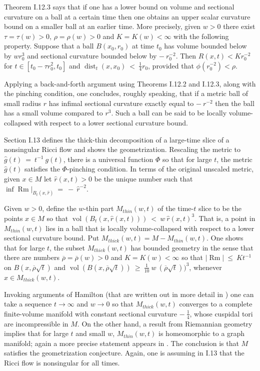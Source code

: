 \documentclass[12pt]{amsart}
\newcommand{\dist}{\operatorname{dist}}
\newcommand{\Rm}{\operatorname{Rm}}
\newcommand{\vol}{\operatorname{vol}}
\numberwithin{equation}{section}
\theoremstyle{plain}
\theoremstyle{definition}
\theoremstyle{remark}
\begin{document}
Theorem I.12.3 says that if one has a lower bound on volume and sectional
curvature on a ball at a certain time then one obtains an upper scalar
curvature bound on a smaller ball at an earlier time.  More precisely,
given $w > 0$ there exist $\tau = \tau(w) > 0$, $\rho = \rho(w) > 0$ and
$K = K(w) < \infty$ with the following property.  Suppose that 
a ball
$B(x_0, r_0)$ at time $t_0$ has volume bounded below by
$w r_0^3$ and sectional curvature bounded below by $- \: r_0^{-2}$. Then
$R(x,t) < K r_0^{-2}$ for
$t \in [t_0 - \tau r_0^2, t_0]$ and $\dist_t(x,x_0) \: < \: \frac14 r_0$,
provided that $\phi(r_0^{-2}) < \rho$. 

Applying a back-and-forth argument using Theorems I.12.2 and I.12.3,
along with the pinching condition, one concludes, roughly speaking,
that if a metric ball of small radius $r$ has infimal sectional curvature
exactly equal to $- \: r^{-2}$ then the ball has a small volume
compared to $r^3$. Such a ball can be said to be locally
volume-collapsed with respect to a lower sectional curvature bound.

Section I.13 defines the thick-thin decomposition of a large-time slice
of 
a nonsingular
Ricci flow and shows the geometrization. 
Rescaling the metric to $\widehat{g}(t) \: = \: t^{-1} \: g(t)$,
there is a universal function $\Phi$ so that for large $t$, the metric
$\widehat{g}(t)$ satisfies the $\Phi$-pinching condition. In terms of the
original unscaled metric, given $x \in M$ let $\widehat{r}(x,t) > 0$ be the unique
number such that $\inf \Rm \big|_{B_t(x,\widehat{r})} \: = \: - \:
\widehat{r}^{-2}$. 

Given $w > 0$, define the $w$-thin part 
$M_{thin}(w,t)$ of the time-$t$ slice to be the points $x \in M$ so that
$\vol(B_t(x, \widehat{r}(x,t))) \: < \: w \: \widehat{r}(x,t)^3$. 
That is, a point
in $M_{thin}(w,t)$ lies in a ball that is locally volume-collapsed
with respect to a lower sectional curvature bound. Put
$M_{thick}(w,t) = M - M_{thin}(w,t)$. One shows that for large $t$, the subset
$M_{thick}(w,t)$ has bounded geometry in the sense that there
are numbers $\overline{\rho} = \overline{\rho}(w) > 0$ and 
$K = K(w) < \infty$ so that $|\Rm| \: \le \: K t^{-1}$ on 
$B(x, \overline{\rho} \sqrt{t})$ and 
$\vol(B(x, \overline{\rho} \sqrt{t})) \: \ge \: \frac{1}{10} \: w \: (\overline{\rho} \sqrt{t}))^3$,
whenever $x \in M_{thick}(w,t)$. 

Invoking arguments of Hamilton (that are written out in more detail in
\cite{Perelman2}) one can take a sequence $t \rightarrow \infty$ and
$w \rightarrow 0$ so that $M_{thick}(w,t)$ converges to a complete finite-volume
manifold with constant sectional curvature $- \: \frac14$, whose cuspidal
tori are incompressible in $M$. On the other hand, a result from Riemannian
geometry implies that for large $t$ and small $w$, $M_{thin}(w,t)$ is homeomorphic to
a graph manifold; again a more precise statement appears in \cite{Perelman2}.
The conclusion is that $M$ satisfies the geometrization conjecture. Again, one is
assuming in 
I.13
that the Ricci flow is nonsingular
for all times.
\end{document}
